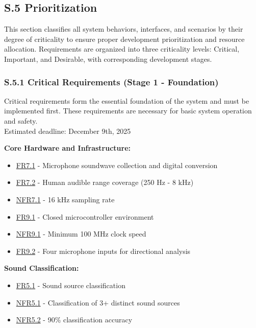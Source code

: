 \documentclass[12pt]{article}
\theoremstyle{definition}
\begin{document}
\subsection{S.5 Prioritization}

This section classifies all system behaviors, interfaces, and scenarios by their
degree of criticality to ensure proper development prioritization and resource
allocation. Requirements are organized into three criticality levels: Critical,
Important, and Desirable, with corresponding development stages.

\subsubsection{S.5.1 Critical Requirements (Stage 1 - Foundation)}

Critical requirements form the essential foundation of the system and must be
implemented first. These requirements are necessary for basic system operation
and safety. \\
\newline
Estimated deadline: December 9th, 2025 \\
\newline

\textbf{Core Hardware and Infrastructure:}
\begin{itemize}
    \item \hyperref[FR7_1]{FR7.1} - Microphone soundwave collection and digital
    conversion
    \item \hyperref[FR7_2]{FR7.2} - Human audible range coverage (250 Hz - 8
    kHz)
    \item \hyperref[NFR7_1]{NFR7.1} - 16 kHz sampling rate
    \item \hyperref[FR9_1]{FR9.1} - Closed microcontroller environment
    \item \hyperref[NFR9_1]{NFR9.1} - Minimum 100 MHz clock speed
    \item \hyperref[FR9_2]{FR9.2} - Four microphone inputs for directional
    analysis
\end{itemize}

\textbf{Sound Classification:}
\begin{itemize}
    \item \hyperref[FR5_1]{FR5.1} - Sound source classification
    \item \hyperref[NFR5_1]{NFR5.1} - Classification of 3+ distinct sound
    sources
    \item \hyperref[NFR5_2]{NFR5.2} - 90\% classification accuracy
\end{itemize}
\end{document}
